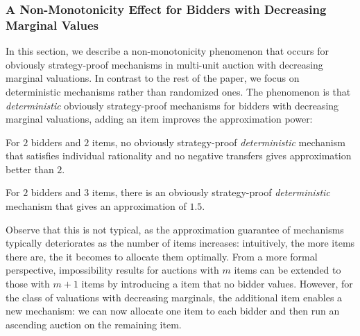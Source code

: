 \subsubsection{A Non-Monotonicity Effect for Bidders with Decreasing Marginal Values}\label{subsub::non-mono}
In this section, we describe a non-monotonicity phenomenon that occurs for obviously strategy-proof mechanisms in multi-unit auction with decreasing marginal valuations.  In contrast to the rest of the paper, we focus on deterministic mechanisms rather than randomized ones. 
The phenomenon is that    \emph{deterministic} obviously strategy-proof mechanisms for bidders with decreasing marginal valuations, 
 adding an item improves the approximation power:
\begin{theorem}\label{thm-lb-mua-dec}
    For $2$ bidders and $2$ items, no obviously strategy-proof \emph{deterministic} mechanism that satisfies individual rationality and no negative transfers gives approximation better than $2$.  
\end{theorem}

\begin{lemma}\label{lemma:mono-mua-dec}
        For $2$ bidders and $3$ items, there is an obviously strategy-proof 
\emph{deterministic} mechanism that gives an approximation of  $1.5$.
\end{lemma}


Observe that this is not typical, as the approximation guarantee of mechanisms typically deteriorates as the number of items increases: intuitively, the more items there are, the  it becomes to allocate them optimally. From a more formal perspective, impossibility results for auctions with $m$ items can be extended to those with $m+1$ items by introducing a  item that no bidder values. However, for the class of valuations with decreasing marginals, the additional item enables a new mechanism: we can now 
 allocate one item to each bidder and then run an ascending auction on the remaining item. 


